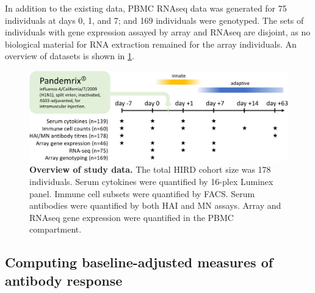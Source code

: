 In addition to the existing data, 
\gls{PBMC} \gls{RNAseq} data was generated for 75 individuals at days 0, 1, and 7;
and 169 individuals were genotyped.
The sets of individuals with gene expression assayed by array and \gls{RNAseq} are disjoint, 
as no biological material for RNA extraction remained for the array individuals.
An overview of datasets is shown in \cref{fig:hird_design}.

\begin{figure}
    \includegraphics[width=1.0\textwidth]{mainmatter/figures/chapter_02/graphics_ashg19/hird_design-crop.pdf}
    \caption{
        \textbf{Overview of study data.}
        The total \gls{HIRD} cohort size was 178 individuals.
        Serum cytokines were quantified by 16-plex Luminex panel.
        Immune cell subsets were quantified by \gls{FACS}.
        Serum antibodies were quantified by both \gls{HAI} and \gls{MN} assays.
        Array and \gls{RNAseq} gene expression were quantified in the \gls{PBMC} compartment.
    }
    \label{fig:hird_design}
\end{figure}

\subsection{Computing baseline-adjusted measures of antibody response}
\label{subsec:hird_dge_TRI}



